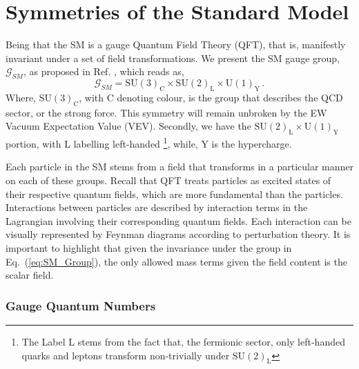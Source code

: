 \documentclass[10pt]{report}
\newcommand{\U}[1]{\mathrm{U}(1)_{\mathrm{#1}}}
\newcommand{\SU}[1]{\mathrm{SU}(2)_{\mathrm{#1}}}
\begin{document}
\section{Symmetries of the Standard Model}
%
Being that the SM is a gauge Quantum Field Theory (QFT), that is, manifestly invariant under a set of field transformations. We present the SM gauge group,  $\mathcal{G}_{SM}$, as proposed in Ref. \cite{Quigg:1983gw}, which reads as,
\begin{equation}
\mathcal{G}_{SM} = \mathrm{SU}(3)_{\mathrm{C}} \times \SU{L} \times \U{Y} \, .
\label{eq:SM_Group}
\end{equation} 
Where, $\mathrm{SU}(3)_{\mathrm{C}}$, with $\mathrm{C}$ denoting colour, is the group that describes the QCD sector, or the strong force. This symmetry will remain unbroken by the EW Vacuum Expectation Value (VEV). Secondly, we have the $\SU{L} \times \U{Y}$ portion, with L labelling left-handed \footnote{The Label L stems from the fact that, the fermionic sector, only left-handed quarks and leptons transform non-trivially under $\SU{L}$}, while, Y is the hypercharge. 

Each particle in the SM stems from a field that transforms in a particular manner on each of these groups.  Recall that QFT treats particles as excited states of their respective quantum fields, which are more fundamental than the particles. Interactions between particles are described by interaction terms in the Lagrangian involving their corresponding quantum fields. Each interaction can be visually represented by Feynman diagrams according to perturbation theory.
%
It is important to highlight that given the invariance under the group in Eq.~(\ref{eq:SM_Group}), the only allowed mass terms given the field content is the scalar field. 

\subsubsection{Gauge Quantum Numbers}
\end{document}
